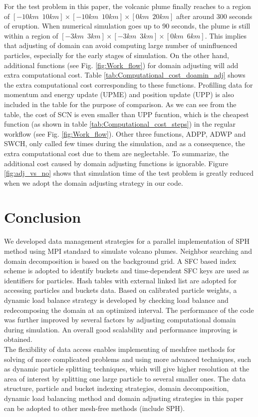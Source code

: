 \documentclass[procedia]{easychair}
\begin{document}
For the test problem in this paper, the volcanic plume finally reaches to a region of $[-10km \,\,\, 10km] \times [-10km\,\,\,10km] \times [0km\,\,\,20km]$ after around 300 seconds of eruption. When numerical simulation goes up to 90 seconds, the plume is still within a region of $[-3km\,\,\,3km] \times [-3km\,\,\,3km] \times [0km\,\,\,6km]$. This implies that adjusting of domain can avoid computing large number of uninfluenced particles, especially for the early stages of simulation. On the other hand, additional functions (see Fig. \ref{fig:Work_flow}) for domain adjusting will add extra computational cost. Table \ref{tab:Computational_cost_doamin_adj} shows the extra computational cost corresponding to these functions. Profilling data for momentum and energy update (UPME) and position update (UPP) is also included in the table for the purpose of comparison. As we can see from the table, the cost of SCN is even smaller than UPP fucntion, which is the cheapest function (as shown in table \ref{tab:Computational_cost_steps}) in the regular workflow (see Fig. \ref{fig:Work_flow}). Other three functions, ADPP, ADWP and SWCH, only called few times during the simulation, and as a consequence, the extra computational cost due to them are neglectable. To summarize, the additional cost caused by domain adjusting functions is ignorable.
Figure \ref{fig:adj_vs_no} shows that simulation time of the test problem is greatly reduced when we adopt the domain adjusting strategy in our code.
\section{Conclusion}
We developed data management strategies for a parallel implementation of SPH method using MPI standard to simulate volcano plumes. Neighbor searching and domain decomposition is based on the background grid. A SFC based index scheme is adopted to identify buckets and time-dependent SFC keys are used as identifiers for particles. 
Hash tables with external linked list are adopted for accessing particles and buckets data. Based on calibrated particle weights, a dynamic load balance strategy is developed by checking load balance and redecomposing the domain at an optimized interval. The performance of the code was further improved by several factors by adjusting computational domain during simulation. 
An overall good scalability and performance improving is obtained.\\
The flexibility of data access enables implementing of meshfree methods for solving of more complicated problems and using more advanced techniques, such as dynamic particle splitting techniques\cite{vacondio2012accurate, feldman2007dynamic}, which will give higher resolution at the area of interest by splitting one large particle to several smaller ones. The data structure, particle and bucket indexing strategies, domain decomposition, dynamic load balancing method and domain adjusting strategies in this paper can be adopted to other mesh-free methods (include SPH).
%
\label{sect:bib}

%
%
%

\end{document}
